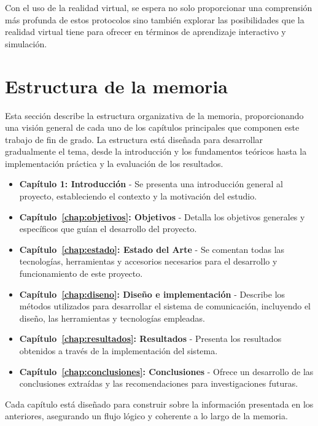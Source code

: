 \documentclass[a4paper, 12pt]{book}
\begin{document}
\bigskip

Con el uso de la realidad virtual, se espera no solo proporcionar una comprensión más profunda de estos protocolos sino también explorar 
las posibilidades que la realidad virtual tiene para ofrecer en términos de aprendizaje interactivo y simulación.


\section{Estructura de la memoria}
\label{sec:estructura}
Esta sección describe la estructura organizativa de la memoria, proporcionando una visión 
general de cada uno de los capítulos principales que componen este trabajo de fin de grado. 
La estructura está diseñada para desarrollar gradualmente el tema, desde la introducción y 
los fundamentos teóricos hasta la implementación práctica y la evaluación de los resultados.

\begin{itemize}
  \item \textbf{Capítulo 1: Introducción} - Se presenta una introducción general al proyecto, estableciendo el contexto y 
  la motivación del estudio.
  
  \item \textbf{Capítulo~\ref{chap:objetivos}: Objetivos} - Detalla los objetivos generales y específicos que guían el desarrollo del proyecto.
  
  \item \textbf{Capítulo~\ref{chap:estado}: Estado del Arte} - Se comentan todas las tecnologías, herramientas y accesorios necesarios
 para el desarrollo y funcionamiento de este proyecto.
  
  \item \textbf{Capítulo~\ref{chap:diseno}: Diseño e implementación} - Describe los métodos utilizados para desarrollar el sistema de comunicación, 
  incluyendo el diseño, las herramientas y tecnologías empleadas.
  
  \item \textbf{Capítulo~\ref{chap:resultados}: Resultados} - Presenta los resultados obtenidos a través de la implementación del sistema.
  
  \item \textbf{Capítulo~\ref{chap:conclusiones}: Conclusiones} - Ofrece un desarrollo de las conclusiones extraídas y 
  las recomendaciones para investigaciones futuras.
\end{itemize}

Cada capítulo está diseñado para construir sobre la información presentada en los anteriores, asegurando un 
flujo lógico y coherente a lo largo de la memoria.
\end{document}
